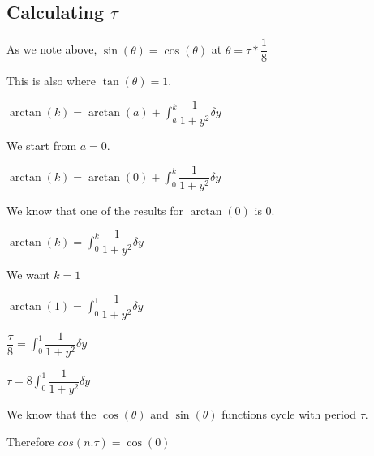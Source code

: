 
\subsection{Calculating \(\tau \)}

As we note above, \(\sin (\theta )=\cos (\theta )\) at \(\theta =\tau *\dfrac{1}{8}\)

This is also where \(\tan (\theta )=1\).

\(\arctan (k)=\arctan (a)+\int_a^k\dfrac{1}{1+y^2} \delta y\)

We start from \(a=0\).

\(\arctan (k)=\arctan (0)+\int_0^k\dfrac{1}{1+y^2} \delta y\)

We know that one of the results for \(\arctan (0)\) is \(0\).

\(\arctan (k)=\int_0^k\dfrac{1}{1+y^2} \delta y\)

We want \(k=1\)

\(\arctan (1)=\int_0^1\dfrac{1}{1+y^2} \delta y\)

\(\dfrac{\tau }{8}=\int_0^1\dfrac{1}{1+y^2} \delta y\)

\(\tau =8\int_0^1\dfrac{1}{1+y^2} \delta y\)

We know that the \(\cos (\theta )\) and \(\sin (\theta )\) functions cycle with period \(\tau \).

Therefore \(cos (n.\tau )=\cos (0)\)

